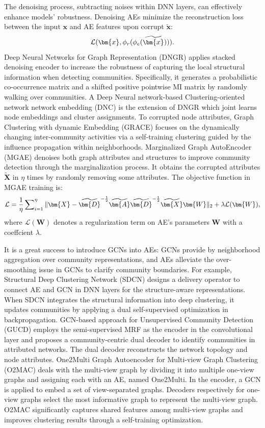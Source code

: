 \label{sec-denoise-ae}
The denoising process, subtracting noises within DNN layers, can effectively enhance models' robustness. Denoising AEs  minimize the reconstruction loss between the input $\bm{x}$ and AE features upon corrupt $\widetilde{\bm{x}}$:
\begin{equation}
\small
\mathcal{L}(\bm{x}, \phi_r(\phi_e(\widetilde{\bm{x}}))). 
\label{eq-ae-denonising}
\end{equation}
Deep Neural Networks for Graph Representation (DNGR)  applies stacked denoising encoder to increase the robustness of capturing the local structural information when detecting communities. Specifically, it generates a probabilistic co-occurrence matrix and a shifted positive pointwise MI matrix by randomly walking over communities. A Deep Neural network-based Clustering-oriented network  network embedding (DNC)  is the extension of DNGR which joint learns node embeddings and cluster assignments.
To corrupted node attributes, Graph Clustering with dynamic Embedding (GRACE)  focuses on the dynamically changing inter-community activities via a self-training clustering guided by the influence propagation within neighborhoods.
Marginalized Graph AutoEncoder (MGAE)  denoises both graph attributes and structures to improve community detection through the marginalization process. It obtains the corrupted attributes $\widetilde{\bm{X}}$ in $\eta$ times by randomly removing some attributes. The objective function in MGAE training is: 
\begin{equation}
\small
\mathcal{L} = \frac{1}{\eta}\sum\nolimits_{i=1}^{\eta}\|\bm{X}-\widetilde{\bm{D}}^{-\frac{1}{2}} \widetilde{\bm{A}} \widetilde{\bm{D}}^{-\frac{1}{2}} \widetilde{\bm{X}} \bm{W}\|_2+\lambda \mathcal{L}(\bm{W}), 
\end{equation}
where $\mathcal{L}(\bm{W})$ denotes a regularization term on AE's parameters $\bm{W}$ with a coeffcient $\lambda$.

\label{sec-gcn-ae}
It is a great success to introduce GCNs into AEs: GCNs provide by neighborhood aggregation over community representations, and AEs alleviate the over-smoothing issue in GCNs to clarify community boundaries. For example, Structural Deep Clustering Network (SDCN)  designs a delivery operator to connect AE and GCN in DNN layers for the structure-aware representations. When SDCN integrates the structural information into deep clustering, it updates communities by applying a dual self-supervised optimization in backpropagation.
GCN-based approach for Unsupervised Community Detection (GUCD)  employs the semi-supervised MRF  as the encoder in the convolutional layer and proposes a community-centric dual decoder to identify communities in attributed networks. The dual decoder reconstructs the network topology and node attributes. 
One2Multi Graph Autoencoder for Multi-view Graph Clustering (O2MAC)  deals with the multi-view graph by dividing it into multiple one-view graphs and assigning each with an AE, named One2Multi. In the encoder, a GCN is applied to embed a set of view-separated graphs. Decoders respectively for one-view graphs select the most informative graph to represent the multi-view graph. O2MAC significantly captures shared features among multi-view graphs and improves clustering results through a self-training optimization.

